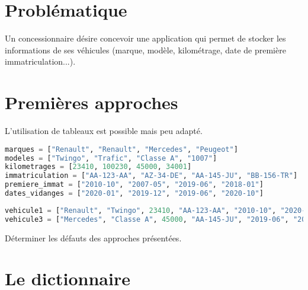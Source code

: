 \documentclass[a4paper,11pt]{article}
\begin{document}
\begin{Form}
\section{Problématique}
Un concessionnaire désire concevoir une application qui permet de stocker les informations de ses véhicules (marque, modèle, kilométrage, date de première immatriculation...).
\begin{center}
\end{center}
\section{Premières approches}
L'utilisation de tableaux est possible mais peu adapté.
\begin{center}
\begin{lstlisting}[language=Python]
marques = ["Renault", "Renault", "Mercedes", "Peugeot"]
modeles = ["Twingo", "Trafic", "Classe A", "1007"]
kilometrages = [23410, 100230, 45000, 34001]
immatriculation = ["AA-123-AA", "AZ-34-DE", "AA-145-JU", "BB-156-TR"]
premiere_immat = ["2010-10", "2007-05", "2019-06", "2018-01"]
dates_vidanges = ["2020-01", "2019-12", "2019-06", "2020-10"]
\end{lstlisting}
\label{moncode}
\end{center}
\begin{center}
\begin{lstlisting}[language=Python]
vehicule1 = ["Renault", "Twingo", 23410, "AA-123-AA", "2010-10", "2020-01"]
vehicule3 = ["Mercedes", "Classe A", 45000, "AA-145-JU", "2019-06", "2019-06"]
\end{lstlisting}
\label{moncode}
\end{center}
\begin{activite}
Déterminer les défauts des approches présentées.
\end{activite}
\section{Le dictionnaire}

\end{Form}
\end{document}
